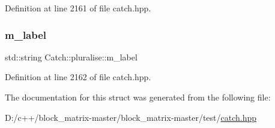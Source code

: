 Definition at line 2161 of file catch.\+hpp.

\mbox{\label{struct_catch_1_1pluralise_a8849cbdd3f11ebe7747597c8644e8793}} 
\subsubsection{\texorpdfstring{m\+\_\+label}{m\_label}}
{\footnotesize\ttfamily std\+::string Catch\+::pluralise\+::m\+\_\+label}



Definition at line 2162 of file catch.\+hpp.



The documentation for this struct was generated from the following file\+:\begin{DoxyCompactItemize}
\item 
D\+:/c++/block\+\_\+matrix-\/master/block\+\_\+matrix-\/master/test/\mbox{\hyperlink{catch_8hpp}{catch.\+hpp}}\end{DoxyCompactItemize}
